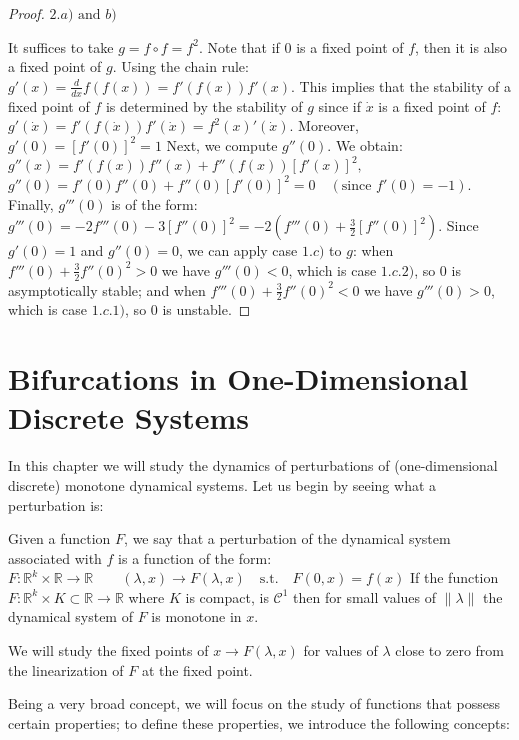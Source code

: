 \documentclass[12pt,a4paper]{report}
\theoremstyle{definition}
\begin{document}
\begin{proof}
$2.a) \text{ and } b)$

It suffices to take $g = f \circ f = f^2$. Note that if $0$ is a fixed point of $f$, then it is also a fixed point of $g$. Using the chain rule:
$
g'(x) = \frac{d}{dx} f(f(x)) = f'(f(x)) f'(x).
$
%
This implies that the stability of a fixed point of $f$ is determined by the stability of $g$ since if $\dot{x}$ is a fixed point of $f$:
$
g'(\dot{x}) = f'(f(\dot{x})) f'(\dot{x}) = f^{2}(x)'(\dot{x}).
$
%
Moreover,
$
g'(0) = \left[ f'(0) \right]^2 = 1
$
%
Next, we compute $g''(0)$. We obtain:
$
g''(x) = f'(f(x)) f''(x) + f''(f(x)) \left[ f'(x) \right]^2,
$
$
g''(0) = f'(0) f''(0) + f''(0) \left[ f'(0) \right]^2 = 0 \quad (\text{since } f'(0) = -1).
$
%
Finally, $g'''(0)$ is of the form:
$
g'''(0) = -2 f'''(0) - 3 \left[ f''(0) \right]^2 = -2\left( f'''(0) + \frac{3}{2} \left[ f''(0) \right]^2 \right).
$
%
Since $g'(0)=1$ and $g''(0)=0$, we can apply case $1.c)$ to $g$: when $f'''(0) + \frac{3}{2} f''(0)^2 > 0$ we have $g'''(0) < 0$, which is case $1.c.2)$, so $0$ is asymptotically stable; and when $f'''(0) + \frac{3}{2} f''(0)^2 < 0$ we have $g'''(0) > 0$, which is case $1.c.1)$, so $0$ is unstable.
\end{proof}
 

\chapter{Bifurcations in One-Dimensional Discrete Systems}\label{chap:bifurcaciones}

In this chapter we will study the dynamics of perturbations of (one-dimensional discrete) monotone dynamical systems. Let us begin by seeing what a perturbation is:

Given a function $F$, we say that a perturbation of the dynamical system associated with $f$ is a function of the form:
$
F : \mathbb{R}^k \times \mathbb{R} \rightarrow \mathbb{R} \quad  \quad (\lambda,x) \rightarrow F(\lambda,x) \quad \text{s.t.}  \quad F(0,x)=f(x)
$
%
If the function $F :\mathbb{R}^k \times  K \subset \mathbb{R} \rightarrow \mathbb{R}$ where $K$ is compact, is $\mathcal{C}^1$ then for small values of $\|\lambda\|$ the dynamical system of $F$ is monotone in $x$.

We will study the fixed points of $x\to F(\lambda,x)$ for values of $\lambda$ close to zero from the linearization of $F$ at the fixed point.

Being a very broad concept, we will focus on the study of functions that possess certain properties; to define these properties, we introduce the following concepts:
\end{document}
